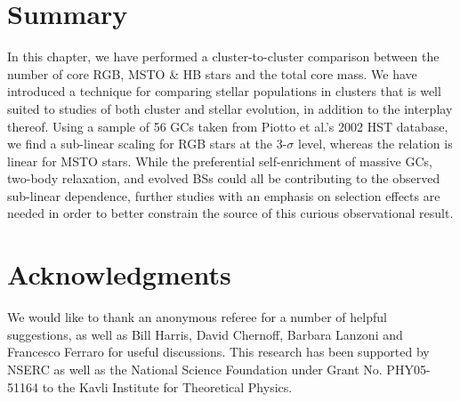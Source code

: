 \section{Summary} \label{summary3}

In this chapter, we have performed a cluster-to-cluster comparison
between the number of core RGB, MSTO \& HB stars 
and the total core mass.  We have introduced a technique for comparing
stellar populations in clusters that is well suited to studies of both
cluster and stellar evolution, in addition to the interplay thereof.
Using a sample of 56 GCs taken from Piotto et al.'s 2002 HST database,
we find a sub-linear scaling for RGB stars at the 3-$\sigma$ level,
whereas the relation is linear for MSTO stars.  While the preferential
self-enrichment of massive GCs, two-body relaxation, and evolved BSs
could all be contributing to the observed sub-linear dependence,
further studies with an emphasis on selection effects are needed in
order to better constrain the source of this curious observational result.

\section*{Acknowledgments}

We would like to thank an anonymous referee for a 
number of helpful suggestions, as well as Bill Harris, 
David Chernoff, Barbara Lanzoni and Francesco Ferraro for useful
discussions.  This research has been supported by NSERC as well as the
National Science Foundation under Grant No. PHY05-51164 to the Kavli
Institute for Theoretical Physics.


